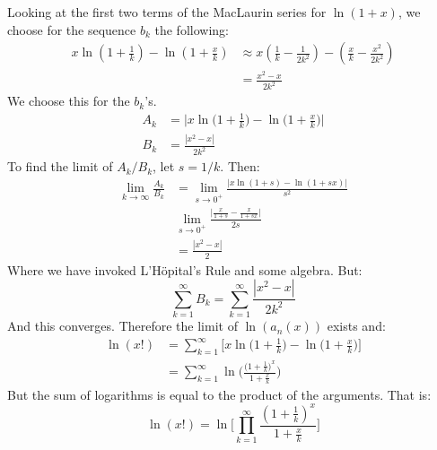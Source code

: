         Looking at the first two terms of the MacLaurin series for
        $\ln(1+x)$, we choose for the sequence $b_{k}$ the following:
        \begin{align}
            x\ln(1+\frac{1}{k})-\ln(1+\frac{x}{k})
            &\approx
            x(\frac{1}{k}-\frac{1}{2k^{2}})
            -(\frac{x}{k}-\frac{x^{2}}{2k^{2}})\\
            &=\frac{x^{2}-x}{2k^{2}}
        \end{align}
        We choose this for the $b_{k}$'s.
        \begin{align}
            A_{k}&=
            \Big|x\ln\big(1+\frac{1}{k}\big)-\ln\big(1+\frac{x}{k}\big)\Big|\\
            B_{k}&=\frac{|x^{2}-x|}{2k^{2}}
        \end{align}
        To find the limit of $A_{k}/B_{k}$, let $s=1/k$. Then:
        \begin{align}
            \underset{k\rightarrow\infty}{\lim}\frac{A_{k}}{B_{k}}
            &=\underset{s\rightarrow{0}^{+}}{\lim}
            \frac{|x\ln(1+s)-\ln(1+sx)|}{s^{2}}\\
            &\underset{s\rightarrow{0}^{+}}{\lim}
            \frac{\big|\frac{x}{1+s}-\frac{x}{1+sx}\big|}{2s}\\
            &=\frac{|x^{2}-x|}{2}
        \end{align}
        Where we have invoked L'H\"{o}pital's Rule and some algebra.
        But:
        \begin{equation}
            \sum_{k=1}^{\infty}B_{k}=
            \sum_{k=1}^{\infty}\frac{|x^{2}-x|}{2k^{2}}
        \end{equation}
        And this converges. Therefore the limit of $\ln(a_{n}(x))$ exists
        and:
        \begin{align}
            \ln(x!)&=\sum_{k=1}^{\infty}\Big[
                x\ln\big(1+\frac{1}{k}\big)-\ln\big(1+\frac{x}{k}\big)\Big]\\
            &=\sum_{k=1}^{\infty}
                \ln\Big(
                    \frac{\big(1+\frac{1}{k}\big)^{x}}{1+\frac{x}{k}}
                    \Big)
        \end{align}
        But the sum of logarithms is equal to the product of the arguments.
        That is:
        \begin{equation}
            \ln(x!)=
            \ln\Big[
                \prod_{k=1}^{\infty}\frac{(1+\frac{1}{k})^{x}}{1+\frac{x}{k}}
            \Big]
        \end{equation}
